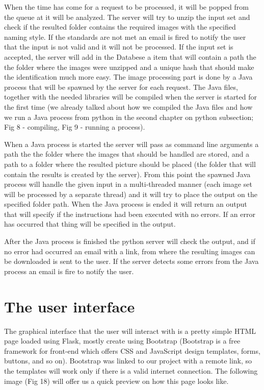 \documentclass[12pt, a4paper]{report}
\begin{document}
When the time has come for a request to be processed, it will be popped from the queue at it will be analyzed. The server will try to unzip the input set and check if the resulted folder contains the required images with the specified naming style. If the standards are not met an email is fired to notify the user that the input is not valid and it will not be processed. If the input set is accepted, the server will add in the Databese a item that will contain a path the the folder where the images were unzipped and a unique hash that should make the identification much more easy. The image processing part is done by a Java process that will be spawned by the server for each request. The Java files, together with the needed libraries will be compiled when the server is started for the first time (we already talked about how we compiled the Java files and how we run a Java process from python in the second chapter on python subsection; Fig 8 - compiling, Fig 9 - running a process). 
\par 

When a Java process is started the server will pass as command line arguments a path the the folder where the images that should be handled are stored, and a path to a folder where the resulted picture should be placed (the folder that will contain the results is created by the server). From this point the spawned Java process will handle the given input in a multi-threaded manner (each image set will be processed by a separate thread) and it will try to place the output on the specified folder path. When the Java process is ended it will return an output that will specify if the instructions had been executed with no errors. If an error has occurred that thing will be specified in the output. 
\par 

After the Java process is finished the python server will check the output, and if no error had occurred an email with a link, from where the resulting images can be downloaded is sent to the user. If the server detects some errors from the Java process an email is fire to notify the user.



\newpage
\section{The user interface}

\quad
The graphical interface that the user will interact with is a pretty simple HTML page loaded using Flask, mostly create using Bootstrap (Bootstrap is a free framework for front-end which offers CSS and JavaScript design templates, forms, buttons, and so on). Bootstrap was linked to our project with a remote link, so the templates will work only if there is a valid internet connection. The following image (Fig 18) will offer us a quick preview on how this page looks like.
\end{document}
